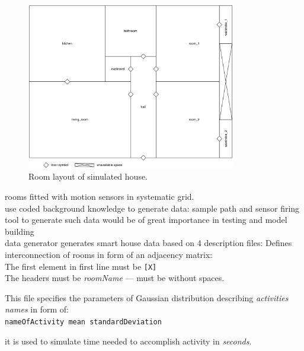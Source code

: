 \documentclass[12pt, a4paper, pdflatex, leqno, twoside, openright]{report}
\begin{document}
\begin{figure}[htb]
  \centering%
  \includegraphics[height=7.3cm]{./gfx/room_layout}
  \caption{Room layout of simulated house.}
\end{figure}

rooms fitted with motion sensors in systematic grid.\\

use coded background knowledge to generate data: sample path and sensor firing\\
tool to generate such data would be of great importance in testing and model building\\

data generator generates smart house data based on 4 description files:
Defines interconnection of rooms in form of an adjacency matrix:\\
% 

The first element in first line must be \texttt{[X]}\\
The headers must be \emph{roomName} --- must be without spaces.

This file specifies the parameters of Gaussian distribution describing \emph{activities names} in form of:\\
\texttt{nameOfActivity mean standardDeviation}

it is used to simulate time needed to accomplish activity in \emph{seconds}.
\end{document}

